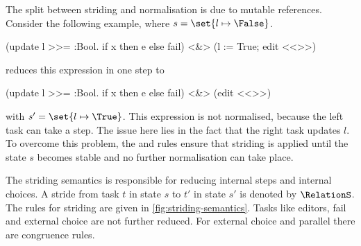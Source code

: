 The split between striding and normalisation is due to mutable references.
Consider the following example, where $s=\set{l\mapsto\False}$.
\begin{TASK}
  (update l >>= \x:Bool. if x then e else fail) <&> (l := True; edit <<>>)
\end{TASK}
\pagebreak[2]
 reduces this expression in one step to
\begin{TASK}
  (update l >>= \x:Bool. if x then e else fail) <&> (edit <<>>)
\end{TASK}
with $s'=\set{l\mapsto\True}$.
This expression is not normalised, because the left task can take a step.
The issue here lies in the fact that the right task updates $l$.
To overcome this problem, the  and  rules ensure that striding is applied until the state $s$ becomes stable and no further normalisation can take place.

The striding semantics is responsible for reducing internal steps and internal choices.
A stride from task $t$ in state $s$ to $t'$ in state $s'$ is denoted by $\RelationS$.
The rules for striding are given in \cref{fig:striding-semantics}.
Tasks like editors, fail and external choice are not further reduced.
For external choice and parallel there are congruence rules.

